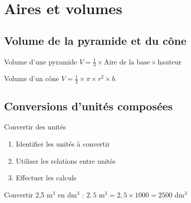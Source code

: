\chapter{Aires et volumes}

\section{Volume de la pyramide et du cône}
\begin{propriete}{Volume d'une pyramide}
$V = \frac{1}{3} \times \text{Aire de la base} \times \text{hauteur}$
\end{propriete}

\begin{propriete}{Volume d'un cône}
$V = \frac{1}{3} \times \pi \times r^2 \times h$
\end{propriete}

\section{Conversions d'unités composées}
\begin{methode}{Convertir des unités}
\begin{enumerate}
    \item Identifier les unités à convertir
    \item Utiliser les relations entre unités
    \item Effectuer les calculs
\end{enumerate}
\end{methode}

\begin{exemple}
Convertir 2,5 m$^3$ en dm$^3$ :
$2,5$ m$^3 = 2,5 \times 1000 = 2500$ dm$^3$
\end{exemple} 